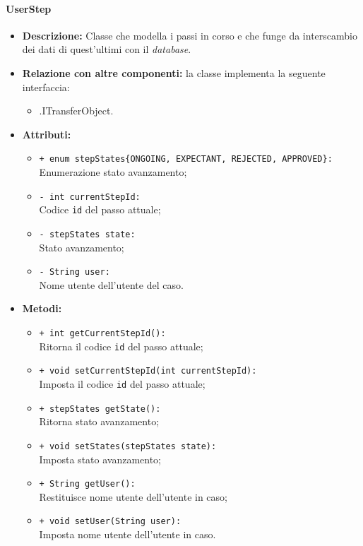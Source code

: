 \paragraph{UserStep}
\label{botuserstep}
\begin{flushleft}
\begin{itemize}
\item \textbf{Descrizione:} Classe che modella i passi in corso e che funge da interscambio dei dati di quest'ultimi con il \textit{database}.
\item \textbf{Relazione con altre componenti:} la classe implementa la seguente interfaccia:
		\begin{itemize}
			\item \smodel{}.ITransferObject.
		\end{itemize}
\item \textbf{Attributi:}
\begin{sloppypar}
\begin{itemize}
\item \texttt{+ enum stepStates\{ONGOING, EXPECTANT, REJECTED, APPROVED\}:}\\ Enumerazione stato avanzamento;
\item \texttt{- int currentStepId:}\\ Codice \texttt{id} del passo attuale;
\item \texttt{- stepStates state:}\\ Stato avanzamento;
\item \texttt{- String user:}\\ Nome utente dell'utente del caso.
\end{itemize}
\end{sloppypar}
\item \textbf{Metodi:}
\begin{sloppypar}
\begin{itemize}
\item \texttt{+ int getCurrentStepId():}\\ Ritorna il codice \texttt{id} del passo attuale;
\item \texttt{+ void setCurrentStepId(int currentStepId):}\\ Imposta il codice \texttt{id} del passo attuale;
\item \texttt{+ stepStates getState():}\\ Ritorna stato avanzamento;
\item \texttt{+ void setStates(stepStates state):}\\ Imposta stato avanzamento;
\item \texttt{+ String getUser():}\\ Restituisce nome utente dell'utente in caso;
\item \texttt{+ void setUser(String user):}\\ Imposta nome utente dell'utente in caso.
\end{itemize}
\end{sloppypar}
\end{itemize}
\end{flushleft}

